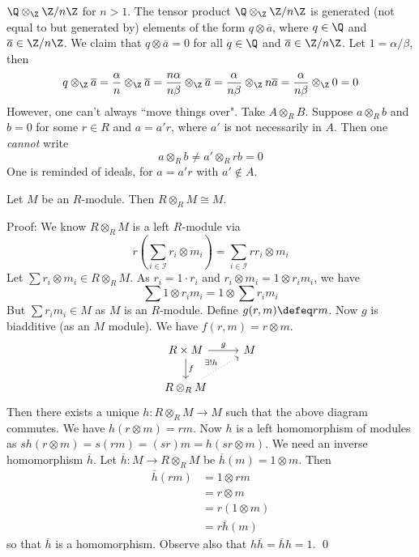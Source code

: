 \begin{ex}
$\Q\otimes_\Z \Z/n\Z$ for $n>1$. The tensor product $\Q \otimes_\Z \Z/n\Z$ is generated (not equal to but generated by) elements of the form $q \otimes \overline{a}$, where $q \in \Q$ and $\overline{a} \in \Z/n\Z$. We claim that $q \otimes \overline{a}=0$ for all $q \in \Q$ and $\overline{a} \in \Z/n\Z$. Let $1=\alpha/\beta$, then
\[
q\otimes_\Z \overline{a} = \frac{\alpha}{n} \otimes_\Z \overline{a}=\frac{n\alpha}{n\beta} \otimes_\Z \overline{a}=\frac{\alpha}{n\beta} \otimes_\Z n \overline{a}= \frac{\alpha}{n\beta} \otimes_\Z 0=0
\]
However, one can't always ``move things over". Take $A \otimes_R B$. Suppose $a \otimes_R b$ and $b=0$ for some $r \in R$ and $a=a'r$, where $a'$ is not necessarily in $A$. Then one \emph{cannot} write
\[
a \otimes_R b \neq a' \otimes_R rb=0
\]
One is reminded of ideals, for $a=a'r$ with $a' \notin A$. 
\end{ex}

\begin{prop}
Let $M$ be an $R$-module. Then $R \otimes_R M \cong M$. 
\end{prop}

Proof: We know $R \otimes_R M$ is a left $R$-module via
\[
r \left(\sum_{i \in \mathcal{I}} r_i \otimes m_i\right)=\sum_{i \in \mathcal{I}} rr_i \otimes m_i
\]
Let $\sum r_i \otimes m_i \in R \otimes_R M$. As $r_i=1\cdot r_i$ and $r_i \otimes m_i=1 \otimes r_im_i$, we have
\[
\sum 1\otimes r_im_i=1\otimes \sum r_im_i
\]
But $\sum r_i m_i \in M$ as $M$ is an $R$-module. Define $g(r,m) \defeq rm$. Now $g$ is biadditive (as an $M$ module). We have $f(r,m)=r \otimes m$.
\[
\begin{tikzcd}
R \times M \arrow{r}{g} \arrow{d}{f} & M \\
R\otimes_R M \arrow[dotted]{ur}{\exists!h}
\end{tikzcd}
\]
Then there exists a unique $h: R \otimes_R M \rightarrow M$ such that the above diagram commutes. We have $h(r \otimes m)=rm$. Now $h$ is a left homomorphism of modules as $sh(r\otimes m)=s(rm)=(sr)m=h(sr\otimes m)$. We need an inverse homomorphism $\overline{h}$. Let $\overline{h}: M \rightarrow R \otimes_R M$ be $\overline{h}(m)=1 \otimes m$. Then
\[
\begin{split}
\overline{h}(rm)&=1\otimes rm \\
&=r \otimes m \\
&=r(1\otimes m) \\
&=r\overline{h}(m)
\end{split}
\]
so that $\overline{h}$ is a homomorphism. Observe also that $h\overline{h}=\overline{h}h=1$. \qed \\

